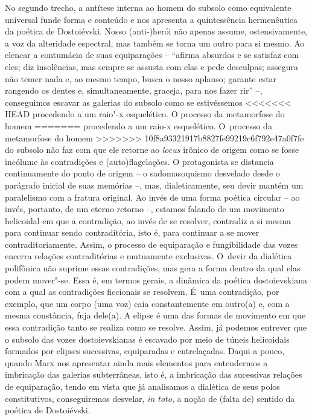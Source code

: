 {No segundo trecho, a antítese interna ao homem do subsolo como
equivalente universal funde forma e conteúdo e nos apresenta a
quintessência hermenêutica da poética de Dostoiévski. Nosso (anti-)herói
não apenas assume, ostensivamente, a voz da alteridade espectral, mas
também se torna um outro para si mesmo. Ao elencar a contumácia de suas
equiparações -- ``afirma absurdos e se satisfaz com eles; diz
insolências, mas sempre se assusta com elas e pede desculpas; assegura
não temer nada e, ao mesmo tempo, busca o nosso aplauso; garante estar
rangendo os dentes e, simultaneamente, graceja, para nos fazer rir'' --,
conseguimos escavar as galerias do subsolo como se estivéssemos
<<<<<<< HEAD
procedendo a um raio"-x esquelético. O processo da metamorfose do homem
=======
procedendo a um raio-x esquelético. O~processo da metamorfose do homem
>>>>>>> 10f8a93321917b8827fe99219c6f792e47a0f7fe
do subsolo não faz com que ele retorne ao \emph{locus} irônico de origem
como se fosse incólume às contradições e (auto)flagelações. O
protagonista se distancia continuamente do ponto de origem -- o
sadomasoquismo desvelado desde o parágrafo inicial de suas memórias --,
mas, dialeticamente, seu devir mantém um paralelismo com a fratura
original. Ao invés de uma forma poética circular -- ao invés, portanto,
de um eterno retorno --, estamos falando de um movimento helicoidal em
que a contradição, ao invés de se resolver, contradiz a si mesma para
continuar sendo contraditória, isto é, para continuar a se mover
contraditoriamente. Assim, o processo de equiparação e fungibilidade das
vozes encerra relações contraditórias e mutuamente exclusivas. O~devir
da dialética polifônica não suprime essas contradições, mas gera a forma
dentro da qual elas podem mover"-se. Essa é, em termos gerais, a dinâmica
da poética dostoievskiana com a qual as contradições ficcionais se
resolvem. É~uma contradição, por exemplo, que um corpo (uma voz) caia
constantemente em outro(a) e, com a mesma constância, fuja dele(a). A
elipse é uma das formas de movimento em que essa contradição tanto se
realiza como se resolve. Assim, já podemos entrever que o subsolo das
vozes dostoievskianas é escavado por meio de túneis helicoidais formados
por elipses sucessivas, equiparadas e entrelaçadas. Daqui a pouco,
quando Marx nos apresentar ainda mais elementos para entendermos a
imbricação das galerias subterrâneas, isto é, a imbricação das
sucessivas relações de equiparação, tendo em vista que já analisamos a
dialética de seus polos constitutivos, conseguiremos desvelar, \emph{in
toto}, a noção de (falta de) sentido da poética de Dostoiévski.

}
